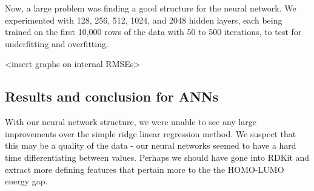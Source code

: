 \documentclass{article}
\begin{document}
Now, a large problem was finding a good structure for the neural network. 
 We experimented with 
128, 256, 512, 1024, and 2048 hidden layers, each being trained on the first
 10,000 rows of the data with 50 to 500 iterations, to test for underfitting and
  overfitting.

<insert graphs on internal RMSEs>

\subsection{Results and conclusion for ANNs}
With our neural network structure, we were unable to see any large 
improvements over the simple ridge linear regression method.  We suspect
 that this may be a quality of the data - our neural networks seemed to 
 have a hard time differentiating between values.  Perhaps we should have gone
  into RDKit and extract more defining features that pertain more to the the 
  HOMO-LUMO energy gap.  
\end{document}
